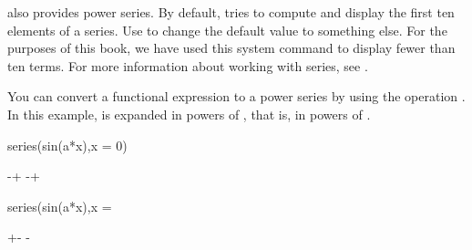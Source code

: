{{{{{{{{%
%

\Language{} also provides power series.
By default, \Language{} tries to compute and display the first ten elements
of a series.
Use  to change the default value
to something else.
For the purposes of this book, we have used this system command to display
fewer than ten terms.
For more information about working with series, see
.

\begin{xtc}
\begin{xtccomment}
You can convert a functional expression to a power series by using the
operation .
In this example,
 is expanded in powers of ,
that is, in powers of .
\end{xtccomment}
\begin{spadsrc}
series(sin(a*x),x = 0)
\end{spadsrc}
\begin{TeXOutput}
\begin{fricasmath}{1}
\TIMES {}-{\TIMES {}}+\TIMES {}%
-{\TIMES {}}+%
%
\end{fricasmath}
\end{TeXOutput}
\end{xtc}
\begin{xtc}
\begin{spadsrc}
series(sin(a*x),x = %
\end{spadsrc}
\begin{TeXOutput}
\begin{fricasmath}{2}
+\TIMES {}\TIMES {}-{%
\TIMES {}}-{\frac{\SUPER{%
}}}
\end{fricasmath}
\end{TeXOutput}
\end{xtc}}}}}}}}}
